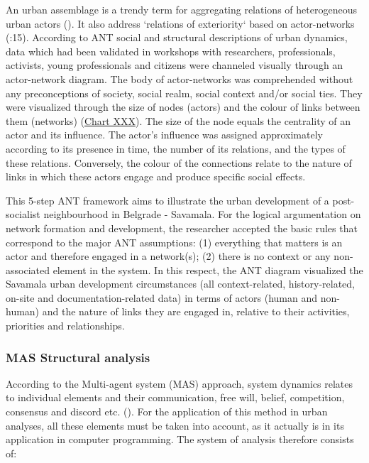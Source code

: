 \documentclass[11pt]{report}
\begin{document}
\begin{enumerate}
An urban assemblage is a trendy term for aggregating relations of heterogeneous urban actors (\href{Muniesa}{\citealt{muniesa_introduction_2007}}). It also address `relations of exteriority` based on actor-networks (\href{Farias}{\citealt{farias_politics_2011}}:15).
According to ANT social and structural descriptions of urban dynamics, data which had been validated in workshops with researchers, professionals, activists, young professionals and citizens were channeled visually through an actor-network diagram. The body of actor-networks was comprehended without any preconceptions of society, social realm, social context and/or social ties. They were visualized through the size of nodes (actors) and the colour of links between them (networks) (\href{Table ANT discource analysos}{Chart XXX}). The size of the node equals the centrality of an actor and its influence. The actor’s influence was assigned approximately according to its presence in time, the number of its relations, and the types of these relations. Conversely, the colour of the connections relate to the nature of links in which these actors engage and produce specific social effects.
\end{enumerate}

This 5-step ANT framework aims to illustrate the urban development of a post-socialist neighbourhood in Belgrade - Savamala. For the logical argumentation on network formation and development, the researcher accepted the basic rules that correspond to the major ANT assumptions: (1) everything that matters is an actor and therefore engaged in a network(s); (2) there is no context or any non-associated element in the system. In this respect, the ANT diagram visualized the Savamala urban development circumstances (all context-related, history-related, on-site and documentation-related data) in terms of actors (human and non-human) and the nature of links they are engaged in, relative to their activities, priorities and relationships.


\subsubsection{MAS Structural analysis}

According to the Multi-agent system (MAS) approach, system dynamics relates to individual elements and their communication, free will, belief, competition, consensus and discord etc. (\href{Ferber}{\citealt{ferber_multi-agent_1999}}).
For the application of this method in urban analyses, all these elements must be taken into account, as it actually is in its application in computer programming. The system of analysis therefore consists of:
\end{document}
